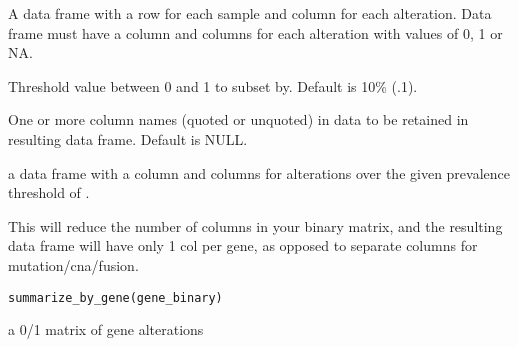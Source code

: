 \documentclass[a4paper]{book}
\begin{document}
\begin{Arguments}
\begin{ldescription}
\item[\code{gene\_binary}] A data frame with a row for each sample and column for each
alteration. Data frame must have a  column and columns for each alteration
with values of 0, 1 or NA.

\item[\code{t}] Threshold value between 0 and 1 to subset by. Default is 10\% (.1).

\item[\code{other\_vars}] One or more column names (quoted or unquoted) in data to be retained
in resulting data frame. Default is NULL.
\end{ldescription}
\end{Arguments}
%
\begin{Value}
a data frame with a  column and columns for
alterations over the given prevalence threshold of .
\end{Value}
%
\begin{Examples}
\end{Examples}
%
\begin{Description}\relax
This will reduce the number of columns in your binary matrix, and the
resulting data frame will have only 1 col per gene, as opposed to separate
columns for mutation/cna/fusion.
\end{Description}
%
\begin{Usage}
\begin{verbatim}
summarize_by_gene(gene_binary)
\end{verbatim}
\end{Usage}
%
\begin{Arguments}
\begin{ldescription}
\item[\code{gene\_binary}] a 0/1 matrix of gene alterations
\end{ldescription}
\end{Arguments}
\end{document}
